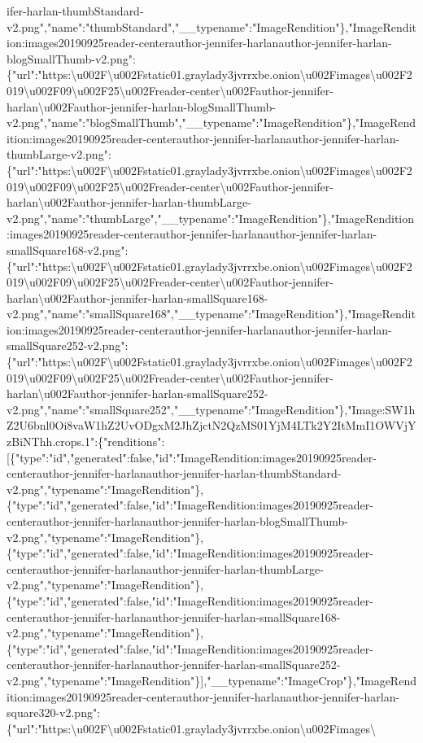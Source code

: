 ifer-harlan-thumbStandard-v2.png","name":"thumbStandard","\_\_typename":"ImageRendition"\},"ImageRendition:images20190925reader-centerauthor-jennifer-harlanauthor-jennifer-harlan-blogSmallThumb-v2.png":\{"url":"https:\textbackslash{}u002F\textbackslash{}u002Fstatic01.graylady3jvrrxbe.onion\textbackslash{}u002Fimages\textbackslash{}u002F2019\textbackslash{}u002F09\textbackslash{}u002F25\textbackslash{}u002Freader-center\textbackslash{}u002Fauthor-jennifer-harlan\textbackslash{}u002Fauthor-jennifer-harlan-blogSmallThumb-v2.png","name":"blogSmallThumb","\_\_typename":"ImageRendition"\},"ImageRendition:images20190925reader-centerauthor-jennifer-harlanauthor-jennifer-harlan-thumbLarge-v2.png":\{"url":"https:\textbackslash{}u002F\textbackslash{}u002Fstatic01.graylady3jvrrxbe.onion\textbackslash{}u002Fimages\textbackslash{}u002F2019\textbackslash{}u002F09\textbackslash{}u002F25\textbackslash{}u002Freader-center\textbackslash{}u002Fauthor-jennifer-harlan\textbackslash{}u002Fauthor-jennifer-harlan-thumbLarge-v2.png","name":"thumbLarge","\_\_typename":"ImageRendition"\},"ImageRendition:images20190925reader-centerauthor-jennifer-harlanauthor-jennifer-harlan-smallSquare168-v2.png":\{"url":"https:\textbackslash{}u002F\textbackslash{}u002Fstatic01.graylady3jvrrxbe.onion\textbackslash{}u002Fimages\textbackslash{}u002F2019\textbackslash{}u002F09\textbackslash{}u002F25\textbackslash{}u002Freader-center\textbackslash{}u002Fauthor-jennifer-harlan\textbackslash{}u002Fauthor-jennifer-harlan-smallSquare168-v2.png","name":"smallSquare168","\_\_typename":"ImageRendition"\},"ImageRendition:images20190925reader-centerauthor-jennifer-harlanauthor-jennifer-harlan-smallSquare252-v2.png":\{"url":"https:\textbackslash{}u002F\textbackslash{}u002Fstatic01.graylady3jvrrxbe.onion\textbackslash{}u002Fimages\textbackslash{}u002F2019\textbackslash{}u002F09\textbackslash{}u002F25\textbackslash{}u002Freader-center\textbackslash{}u002Fauthor-jennifer-harlan\textbackslash{}u002Fauthor-jennifer-harlan-smallSquare252-v2.png","name":"smallSquare252","\_\_typename":"ImageRendition"\},"Image:SW1hZ2U6bnl0Oi8vaW1hZ2UvODgxM2JhZjctN2QzMS01YjM4LTk2Y2ItMmI1OWVjYzBiNThh.crops.1":\{"renditions":{[}\{"type":"id","generated":false,"id":"ImageRendition:images20190925reader-centerauthor-jennifer-harlanauthor-jennifer-harlan-thumbStandard-v2.png","typename":"ImageRendition"\},\{"type":"id","generated":false,"id":"ImageRendition:images20190925reader-centerauthor-jennifer-harlanauthor-jennifer-harlan-blogSmallThumb-v2.png","typename":"ImageRendition"\},\{"type":"id","generated":false,"id":"ImageRendition:images20190925reader-centerauthor-jennifer-harlanauthor-jennifer-harlan-thumbLarge-v2.png","typename":"ImageRendition"\},\{"type":"id","generated":false,"id":"ImageRendition:images20190925reader-centerauthor-jennifer-harlanauthor-jennifer-harlan-smallSquare168-v2.png","typename":"ImageRendition"\},\{"type":"id","generated":false,"id":"ImageRendition:images20190925reader-centerauthor-jennifer-harlanauthor-jennifer-harlan-smallSquare252-v2.png","typename":"ImageRendition"\}{]},"\_\_typename":"ImageCrop"\},"ImageRendition:images20190925reader-centerauthor-jennifer-harlanauthor-jennifer-harlan-square320-v2.png":\{"url":"https:\textbackslash{}u002F\textbackslash{}u002Fstatic01.graylady3jvrrxbe.onion\textbackslash{}u002Fimages\textbackslash{}
